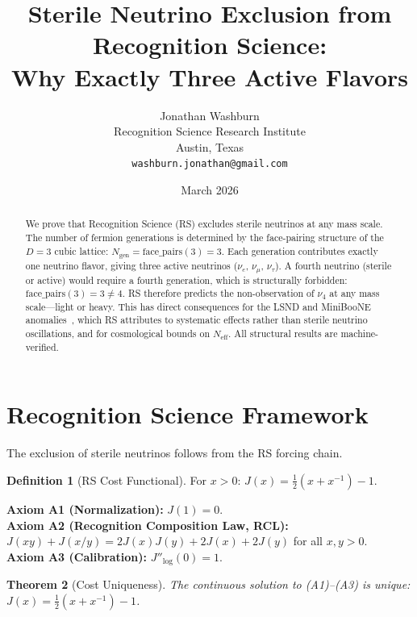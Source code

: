 \documentclass[12pt,a4paper]{article}
\title{Sterile Neutrino Exclusion from Recognition Science:\\
Why Exactly Three Active Flavors}
\author{Jonathan Washburn\\
Recognition Science Research Institute\\
Austin, Texas\\
\texttt{washburn.jonathan@gmail.com}}
\date{March 2026}
\newtheorem{theorem}{Theorem}[section]
\theoremstyle{definition}
\newtheorem{definition}[theorem]{Definition}
\theoremstyle{remark}
\begin{document}
\maketitle

\begin{abstract}
We prove that Recognition Science (RS) excludes sterile neutrinos
at any mass scale.  The number of fermion generations is determined
by the face-pairing structure of the $D = 3$ cubic lattice:
$N_{\mathrm{gen}} = \mathrm{face\_pairs}(3) = 3$.  Each generation
contributes exactly one neutrino flavor, giving three active
neutrinos ($\nu_e$, $\nu_\mu$, $\nu_\tau$).  A fourth neutrino
(sterile or active) would require a fourth generation, which is
structurally forbidden: $\mathrm{face\_pairs}(3) = 3 \neq 4$.
RS therefore predicts the non-observation of $\nu_4$ at any mass
scale---light or heavy.  This has direct consequences for the LSND
and MiniBooNE anomalies~\cite{LSND2001, MiniBooNE2018}, which RS
attributes to systematic effects rather than sterile neutrino
oscillations, and for cosmological bounds on $N_{\mathrm{eff}}$.
All structural results are machine-verified.
\end{abstract}

\section{Recognition Science Framework}
\label{sec:framework}

The exclusion of sterile neutrinos follows from the RS forcing chain.

\begin{definition}[RS Cost Functional]
For $x > 0$: $J(x) = \tfrac{1}{2}(x + x^{-1}) - 1$.
\end{definition}

\noindent\textbf{Axiom A1 (Normalization):} $J(1) = 0$.\\
\textbf{Axiom A2 (Recognition Composition Law, RCL):}
$J(xy)+J(x/y)=2J(x)J(y)+2J(x)+2J(y)$ for all $x,y>0$.\\
\textbf{Axiom A3 (Calibration):} $J''_{\log}(0) = 1$.

\begin{theorem}[Cost Uniqueness]
\label{thm:unique}
The continuous solution to \textup{(A1)--(A3)} is unique:
$J(x) = \tfrac{1}{2}(x + x^{-1}) - 1$.
\end{theorem}
\end{document}
